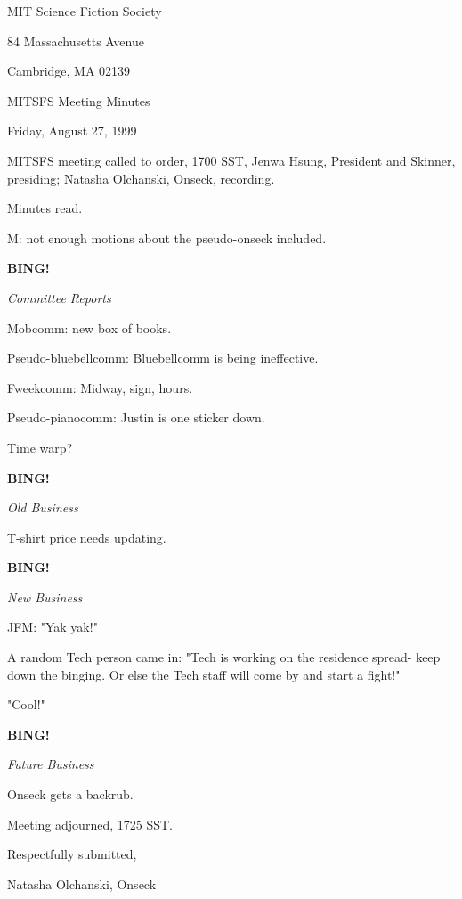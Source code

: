 \documentclass[12pt]{article}
\newcommand{\bing}{{\bf BING!} }
\newcommand{\goto}[1]{\bing \vskip 12pt \centerline{{\em{#1}}}}
\begin{document}
\begin{center}

MIT Science Fiction Society 

84 Massachusetts Avenue

Cambridge, MA 02139

\vspace{12pt}

MITSFS Meeting Minutes 

Friday, August 27, 1999

\end{center}
 
\vspace{18pt}

\setlength{\parskip}{6pt}

\noindent
MITSFS meeting called to order, 1700 SST,
Jenwa Hsung, President and Skinner, presiding; Natasha Olchanski, Onseck, recording.

Minutes read.

M: not enough motions about the pseudo-onseck included.

\goto{Committee Reports}

Mobcomm: new box of books.

Pseudo-bluebellcomm: Bluebellcomm is being ineffective.

Fweekcomm: Midway, sign, hours.

Pseudo-pianocomm: Justin is one sticker down.

Time warp?

\goto{Old Business}

T-shirt price needs updating.

\goto{New Business}

JFM: "Yak yak!"

A random Tech person came in: "Tech is working on the residence spread- keep down the binging. Or else the Tech staff will come by and start a fight!"

"Cool!"

\goto{Future Business}

Onseck gets a backrub.

\vspace{12pt}

\noindent
Meeting adjourned, 1725 SST.

\vspace{18pt}

\centerline{Respectfully submitted,}
\centerline{Natasha Olchanski, Onseck}
\end{document}
